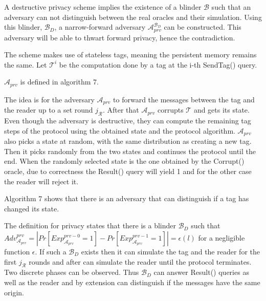     A destructive privacy scheme implies the existence of a blinder $\mathcal{B}$ such that an adversary can not distinguish between the real oracles and 
    their simulation.
    Using this blinder, $\mathcal{B}_D$, a narrow-forward adversary $\mathcal{A}_{prv}^{\mathcal{B}_D}$ can be constructed. This adversary will be 
    able to thwart forward privacy, hence the contradiction.

    The scheme makes use of stateless tags, meaning the persistent memory remains the same. Let $\mathcal{T}^{i}$ be the computation done by a tag
    at the i-th SendTag() query. 

    $\mathcal{A}_{prv}$ is defined in algorithm 7.

    The idea is for the adversary $\mathcal{A}_{prv}$ to forward the messages between the tag and the reader up to a set round $j_{\mathcal{R}}$. After that $\mathcal{A}_{prv}$
    corrupts $\mathcal{T}$ and gets its state. Even though the adversary is destructive, they can compute the remaining tag steps of the protocol using the 
    obtained state and the protocol algorithm. $\mathcal{A}_{prv}$ also picks a state at random, with the same distribution as creating a new tag. 
    Then it picks randomly from the two states and continues the protocol until the end. When the randomly selected state is the one obtained by the 
    Corrupt() oracle, due to correctness the Result() query will yield 1 and for the other case the reader will reject it.

    Algorithm 7 shows that there is an adversary that can distinguish if a tag has changed its state.

    The definition for privacy states that there is a blinder $\mathcal{B}_D$ such that $Adv_{\mathcal{A}_{prv}}^{prv} = | Pr[Exp_{\mathcal{A}_{prv}}^{prv-0} = 1] - 
    Pr[Exp_{\mathcal{A}_{prv}}^{prv-1} = 1] | = \epsilon(l)$ for a negligible function $\epsilon$. If such a $\mathcal{B}_D$ exists then it can simulate the tag
    and the reader for the first $j_{\mathcal{R}}$ rounds and after can simulate the reader until the protocol terminates. Two discrete phases can be observed.
    Thus $\mathcal{B}_D$ can answer Result() queries as well as the reader and by extension can distinguish if the messages have the same origin.

